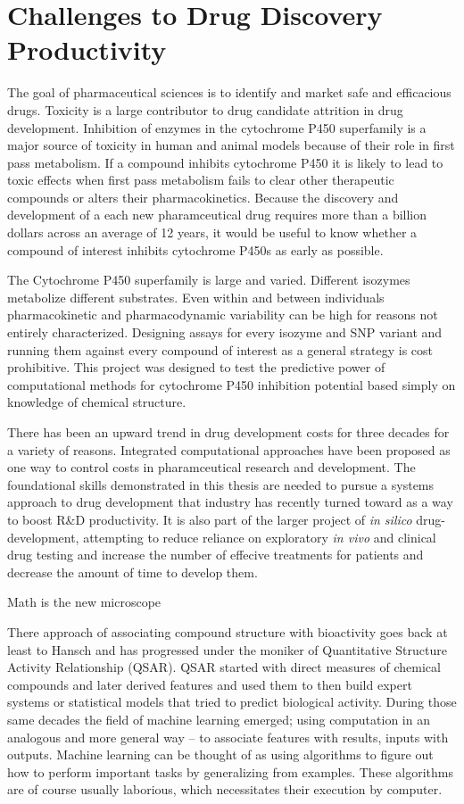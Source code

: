 
\section{Challenges to Drug Discovery Productivity}

The goal of pharmaceutical sciences is to identify and market safe and efficacious drugs. Toxicity is a large contributor to drug candidate attrition in drug development. Inhibition of enzymes in the cytochrome P450 superfamily is a major source of toxicity in human and animal models because of their role in first pass metabolism. If a compound inhibits cytochrome P450 it is likely to lead to toxic effects when first pass metabolism fails to clear other therapeutic compounds or alters their pharmacokinetics. Because the discovery and development of a each new pharamceutical drug requires more than a billion dollars across an average of 12 years, it would be useful to know whether a compound of interest inhibits cytochrome P450s as early as possible.

The Cytochrome P450 superfamily is large and varied. Different isozymes metabolize different substrates. Even within and between individuals pharmacokinetic and pharmacodynamic variability can be high for reasons not entirely characterized. Designing assays for every isozyme and SNP variant and running them against every compound of interest as a general strategy is cost prohibitive. This project was designed to test the predictive power of computational methods for cytochrome P450 inhibition potential based simply on knowledge of chemical structure.

There has been an upward trend in drug development costs for three decades for a variety of reasons. Integrated computational approaches have been proposed as one way to control costs in pharamceutical research and development. The foundational skills demonstrated in this thesis are needed to pursue a systems approach to drug development that industry has recently turned toward as a way to boost R\&D productivity. \cite{Visser2014,Berg2014} It is also part of the larger project of \textit{in silico} drug-development, attempting to reduce reliance on exploratory \textit{in vivo} and clinical drug testing and increase the number of effecive treatments for patients and decrease the amount of time to develop them.

Math is the new microscope \cite{Cohen2004}

There approach of associating compound structure with bioactivity goes back at least to Hansch \cite{Hansch1964} and has progressed under the moniker of Quantitative Structure Activity Relationship (QSAR). QSAR started with direct measures of chemical compounds and later derived features and used them to then build expert systems or statistical models that tried to predict biological activity. During those same decades the field of machine learning emerged; using computation in an analogous and more general way -- to associate features with results, inputs with outputs. Machine learning can be thought of as using algorithms to figure out how to perform important tasks by generalizing from examples. These algorithms are of course usually laborious, which necessitates their execution by computer.

